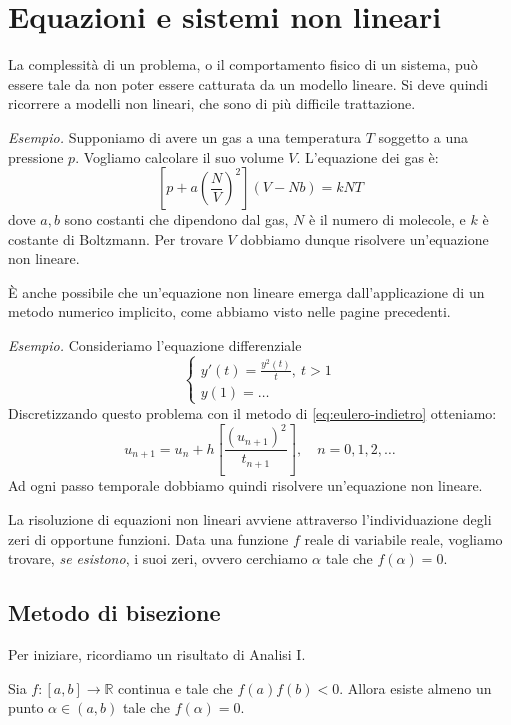 \chapter{Equazioni e sistemi non lineari}

La complessità di un problema, o il comportamento fisico di un sistema, può essere tale da non poter essere catturata da un modello lineare.
Si deve quindi ricorrere a modelli non lineari, che sono di più difficile trattazione.

\textit{Esempio.}
Supponiamo di avere un gas a una temperatura $T$ soggetto a una pressione $p$. Vogliamo calcolare il suo volume $V$. L'equazione dei gas è:
\begin{equation*}
\left[ p+a\left(\frac{N}{V}\right)^{2}\right]( V-Nb) =kNT
\end{equation*}
dove $a,b$ sono costanti che dipendono dal gas, $N$ è il numero di molecole, e $k$ è costante di Boltzmann. Per trovare $V$ dobbiamo dunque risolvere un'equazione non lineare.

È anche possibile che un'equazione non lineare emerga dall'applicazione di un metodo numerico implicito, come abbiamo visto nelle pagine precedenti.

\textit{Esempio.}
Consideriamo l'equazione differenziale
\begin{equation*}
\begin{cases}
y'(t) =\frac{y^{2}(t)}{t} ,\ t >1\\
y(1) =\dotsc
\end{cases}
\end{equation*}
Discretizzando questo problema con il metodo di \eqref{eq:eulero-indietro} otteniamo:
\begin{equation*}
u_{n+1} =u_{n} +h\left[\frac{( u_{n+1})^{2}}{t_{n+1}}\right] ,\quad n=0,1,2,\dotsc
\end{equation*}
Ad ogni passo temporale dobbiamo quindi risolvere un'equazione non lineare.

La risoluzione di equazioni non lineari avviene attraverso l'individuazione degli zeri di opportune funzioni.
Data una funzione $f$ reale di variabile reale, vogliamo trovare, \textit{se esistono}, i suoi zeri, ovvero cerchiamo $\alpha $ tale che $f( \alpha ) =0$.

\section{Metodo di bisezione}
Per iniziare, ricordiamo un risultato di Analisi I.
\begin{theorem}
[di Bolzano]
Sia $f:[ a,b]\rightarrow \mathbb{R}$ continua e tale che $f(a) f(b) < 0$.
Allora esiste almeno un punto $\alpha \in ( a,b)$ tale che $f( \alpha ) =0$.
\end{theorem}

